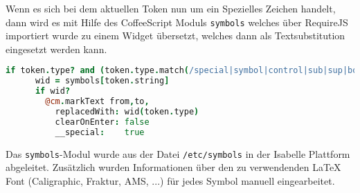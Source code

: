 Wenn es sich bei dem aktuellen Token nun um ein Spezielles Zeichen handelt, dann wird es mit Hilfe
des CoffeeScript Moduls \texttt{symbols} welches über RequireJS importiert wurde zu einem Widget
übersetzt, welches dann als Textsubstitution eingesetzt werden kann.

\begin{lstlisting}[language=coffee]
    if token.type? and (token.type.match(/special|symbol|control|sub|sup|bold/))
      wid = symbols[token.string]
      if wid?
        @cm.markText from,to,          
          replacedWith: wid(token.type)
          clearOnEnter: false
          __special:    true
\end{lstlisting}

Das \texttt{symbols}-Modul wurde aus der Datei \texttt{/etc/symbols} in der Isabelle Plattform
abgeleitet. Zusätzlich wurden Informationen über den zu verwendenden LaTeX Font (Caligraphic,
Fraktur, AMS, ...) für jedes Symbol manuell eingearbeitet.